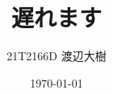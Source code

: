 \documentclass[a4paper,11pt]{jsarticle}
\begin{document}
\title{遅れます}
\author{21T2166D 渡辺大樹}
\date{\today}
\maketitle
\end{document}
